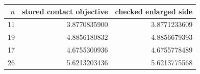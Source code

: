 \begin{tabular}{rrr}\toprule
$n$ & stored contact objective & checked enlarged side\\\midrule
11 & 3.8770835900 & 3.8771233609\\
19 & 4.8856180832 & 4.8856679393\\
17 & 4.6755300936 & 4.6755778489\\
26 & 5.6213203436 & 5.6213775568\\
\bottomrule\end{tabular}
